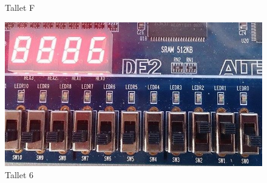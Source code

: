 \begin{enumerate}
\begin{figure}[h]
		\caption{Tallet F}
		\label{fig:binTo7SegHexF}
	\end{figure}
	\begin{figure}[h]
		\centering
		\includegraphics[scale=0.3]{pictures/Oevelse5/opg2/binTo7SegHex6.JPG}		\caption{Tallet 6}
		\label{fig:binTo7SegHex6}
	\end{figure}
\end{enumerate}	
\clearpage